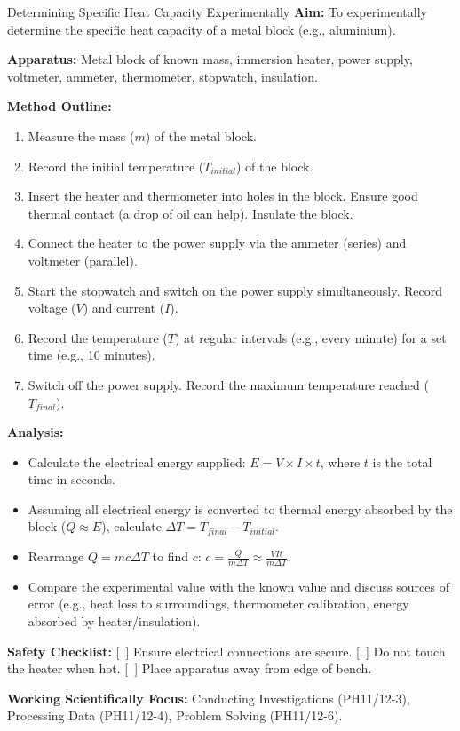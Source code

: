 \begin{investigation}{Determining Specific Heat Capacity Experimentally}
\textbf{Aim:} To experimentally determine the specific heat capacity of a metal block (e.g., aluminium).

\textbf{Apparatus:} Metal block of known mass, immersion heater, power supply, voltmeter, ammeter, thermometer, stopwatch, insulation.

\textbf{Method Outline:}
\begin{enumerate}
    \item Measure the mass (\(m\)) of the metal block.
    \item Record the initial temperature (\(T_{initial}\)) of the block.
    \item Insert the heater and thermometer into holes in the block. Ensure good thermal contact (a drop of oil can help). Insulate the block.
    \item Connect the heater to the power supply via the ammeter (series) and voltmeter (parallel).
    \item Start the stopwatch and switch on the power supply simultaneously. Record voltage (\(V\)) and current (\(I\)).
    \item Record the temperature (\(T\)) at regular intervals (e.g., every minute) for a set time (e.g., 10 minutes).
    \item Switch off the power supply. Record the maximum temperature reached (\(T_{final}\)).
\end{enumerate}

\textbf{Analysis:}
\begin{itemize}
    \item Calculate the electrical energy supplied: \(E = V \times I \times t\), where \(t\) is the total time in seconds.
    \item Assuming all electrical energy is converted to thermal energy absorbed by the block (\(Q \approx E\)), calculate \(\Delta T = T_{final} - T_{initial}\).
    \item Rearrange \(Q = mc\Delta T\) to find \(c\): \(c = \frac{Q}{m\Delta T} \approx \frac{VIt}{m\Delta T}\).
    \item Compare the experimental value with the known value and discuss sources of error (e.g., heat loss to surroundings, thermometer calibration, energy absorbed by heater/insulation).
\end{itemize}

\textbf{Safety Checklist:} [\ ] Ensure electrical connections are secure. [\ ] Do not touch the heater when hot. [\ ] Place apparatus away from edge of bench.

\textbf{Working Scientifically Focus:} Conducting Investigations (PH11/12-3), Processing Data (PH11/12-4), Problem Solving (PH11/12-6).
\end{investigation}

